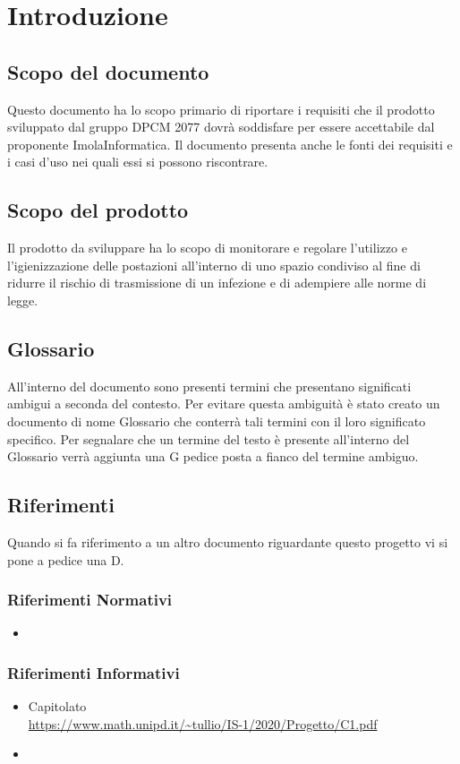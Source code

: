 \section{Introduzione}

\subsection{Scopo del documento}
Questo documento ha lo scopo primario di riportare i requisiti che il prodotto sviluppato dal gruppo DPCM 2077 dovrà soddisfare per essere accettabile dal proponente ImolaInformatica.
Il documento presenta anche le fonti dei requisiti e i casi d'uso nei quali essi si possono riscontrare.
\subsection{Scopo del prodotto}
Il prodotto da sviluppare ha lo scopo di monitorare e regolare l'utilizzo e l'igienizzazione delle postazioni all'interno di uno spazio condiviso al fine di ridurre il rischio di trasmissione di un infezione e di adempiere alle norme di legge. 
\subsection{Glossario} 
All'interno del  documento sono presenti termini che presentano significati ambigui a seconda del contesto.
Per evitare questa ambiguità è stato creato un  documento di nome Glossario che  conterrà tali termini con il loro significato specifico. Per segnalare che un termine del testo è presente all'interno del Glossario verrà aggiunta una G pedice posta a fianco del termine ambiguo.
\subsection{Riferimenti}
Quando si fa riferimento a un altro documento riguardante questo progetto vi si pone a pedice una D.
\subsubsection{Riferimenti Normativi}
\begin{itemize}
	\item {}
\end{itemize}

\subsubsection{Riferimenti Informativi}
\begin{itemize}
	\item{Capitolato \\
		\url{https://www.math.unipd.it/~tullio/IS-1/2020/Progetto/C1.pdf}}
	\item {}
\end{itemize}